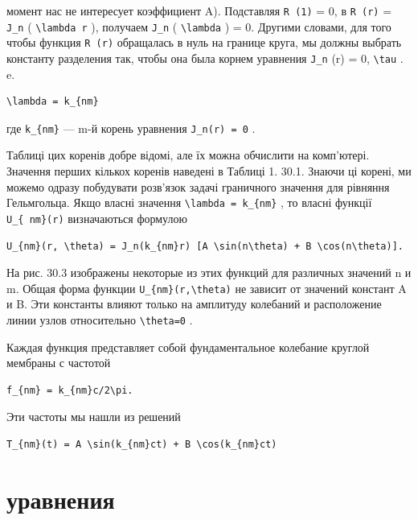 \documentclass[
  ukrainian,
]{article}
\begin{document}
момент нас не интересует коэффициент A). Подставляя \texttt{R\ (1)} = 0,
в \texttt{R\ (r)} = \texttt{J\_n} ( \texttt{\textbackslash{}lambda\ r}
), получаем \texttt{J\_n} ( \texttt{\textbackslash{}lambda} ) = 0.
Другими словами, для того чтобы функция \texttt{R\ (r)} обращалась в
нуль на границе круга, мы должны выбрать константу разделения так, чтобы
она была корнем уравнения \texttt{J\_n} (r) = 0,
\texttt{\textbackslash{}tau} . e.

\begin{verbatim}
\lambda = k_{nm}
\end{verbatim}

где \texttt{k\_\{nm\}} --- m-й корень уравнения \texttt{J\_n(r)\ =\ 0} .

Таблиці цих коренів добре відомі, але їх можна обчислити на комп'ютері.
Значення перших кількох коренів наведені в Таблиці 1. 30.1. Знаючи ці
корені, ми можемо одразу побудувати розв'язок задачі граничного значення
для рівняння Гельмгольца. Якщо власні значення
\texttt{\textbackslash{}lambda\ =\ k\_\{nm\}} , то власні функції
\texttt{U\_\{\ nm\}(r)} визначаються формулою

\begin{verbatim}
U_{nm}(r, \theta) = J_n(k_{nm}r) [A \sin(n\theta) + B \cos(n\theta)].
\end{verbatim}

На рис. 30.3 изображены некоторые из этих функций для различных значений
n и m. Общая форма функции \texttt{U\_\{nm\}(r,\textbackslash{}theta)}
не зависит от значений констант A и B. Эти константы влияют только на
амплитуду колебаний и расположение линии узлов относительно
\texttt{\textbackslash{}theta=0} .

Каждая функция представляет собой фундаментальное колебание круглой
мембраны с частотой

\begin{verbatim}
f_{nm} = k_{nm}c/2\pi.
\end{verbatim}

Эти частоты мы нашли из решений

\begin{verbatim}
T_{nm}(t) = A \sin(k_{nm}ct) + B \cos(k_{nm}ct)
\end{verbatim}

\section{уравнения}\label{ux443ux440ux430ux432ux43dux435ux43dux438ux44f}
\end{document}
